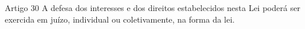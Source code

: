 \begin{frame}{Artigo 30}
A defesa dos interesses e dos direitos estabelecidos nesta Lei poderá ser exercida em juízo, individual ou coletivamente, na forma da lei.
\end{frame}